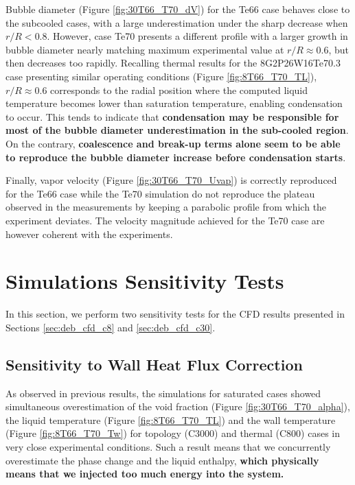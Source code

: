 Bubble diameter (Figure \ref{fig:30T66_T70_dV}) for the Te66 case behaves close to the subcooled cases, with a large underestimation under the sharp decrease when $r/R < 0.8$. However, case Te70 presents a different profile with a larger growth in bubble diameter nearly matching maximum experimental value at $r/R \approx 0.6$, but then decreases too rapidly. Recalling thermal results for the 8G2P26W16Te70.3 case presenting similar operating conditions (Figure \ref{fig:8T66_T70_TL}), $r/R \approx 0.6$ corresponds to the radial position where the computed liquid temperature becomes lower than saturation temperature, enabling condensation to occur. This tends to indicate that \textbf{condensation may be responsible for most of the bubble diameter underestimation in the sub-cooled region}. On the contrary, \textbf{coalescence and break-up terms alone seem to be able to reproduce the bubble diameter increase before condensation starts}.

\npar

Finally, vapor velocity (Figure \ref{fig:30T66_T70_Uvap}) is correctly reproduced for the Te66 case while the Te70 simulation do not reproduce the plateau observed in the measurements by keeping a parabolic profile from which the experiment deviates. The velocity magnitude achieved for the Te70 case are however coherent with the experiments. 


\section{Simulations Sensitivity Tests}

In this section, we perform two sensitivity tests for the CFD results presented in Sections \ref{sec:deb_cfd_c8} and \ref{sec:deb_cfd_c30}. 


\subsection{Sensitivity to Wall Heat Flux Correction}


As observed in previous results, the simulations for saturated cases showed simultaneous overestimation of the void fraction (Figure \ref{fig:30T66_T70_alpha}), the liquid temperature (Figure \ref{fig:8T66_T70_TL}) and the wall temperature (Figure \ref{fig:8T66_T70_Tw}) for topology (C3000) and thermal (C800) cases in very close experimental conditions. Such a result means that we concurrently overestimate the phase change and the liquid enthalpy, \textbf{which physically means that we injected too much energy into the system.}

